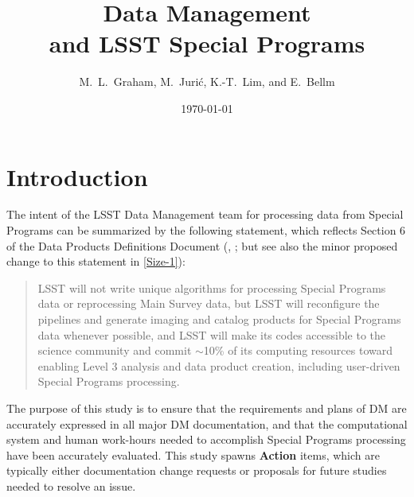 \documentclass[DM,lsstdraft,toc]{lsstdoc}
\title[LSST Special Programs]{Data Management \\ and LSST Special Programs}
\author{M.~L.~Graham, M.~Juri\'{c}, K.-T.~Lim, and E.~Bellm}
\date{\today}
\begin{document}
\maketitle




\section{Introduction} \label{sec:intro}

The intent of the LSST Data Management team for processing data from Special Programs can be summarized by the following statement, which reflects Section 6 of the Data Products Definitions Document (\DPDD, ; but see also the minor proposed change to this statement in \ref{Size-1}):

\begin{quote}
LSST will not write unique algorithms for processing Special Programs data or reprocessing Main Survey data, but LSST will reconfigure the pipelines and generate imaging and catalog products for Special Programs data whenever possible, and LSST will make its codes accessible to the science community and commit $\sim$10\% of its computing resources toward enabling Level 3 analysis and data product creation, including user-driven Special Programs processing.
\end{quote}

\noindent The purpose of this study is to ensure that the requirements and plans of DM are accurately expressed in all major DM documentation, and that the computational system and human work-hours needed to accomplish Special Programs processing have been accurately evaluated. This study spawns \textbf{Action} items, which are typically either documentation change requests or proposals for future studies needed to resolve an issue.

\end{document}
